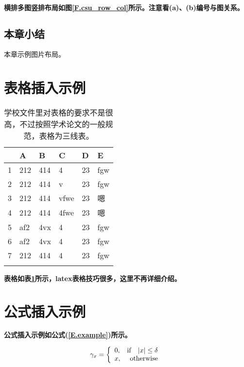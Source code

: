 \textbf{横排多图竖排布局如图\ref{F.csu_row_col}所示。注意看(a)、(b)编号与图关系。}

\subsection{本章小结}
本章示例图片布局。

\newpage


\section{表格插入示例}

\begin{table}[htb]
  \centering
  \caption{学校文件里对表格的要求不是很高，不过按照学术论文的一般规范，表格为三线表。}
  \label{T.example}
  \begin{tabular}{llllll}
  \hline
   & A  & B  & C  & D  & E \\
  \hline
1 	& 212 & 414 & 4 		& 23 & fgw	\\
2 	& 212 & 414 & v 		& 23 & fgw	\\
3 	& 212 & 414 & vfwe		& 23 & 嗯	\\
4 	& 212 & 414 & 4fwe		& 23 & 嗯	\\
5 	& af2 & 4vx & 4 		& 23 & fgw	\\
6 	& af2 & 4vx & 4 		& 23 & fgw	\\
7 	& 212 & 414 & 4 		& 23 & fgw	\\

\hline{}
\end{tabular}
\end{table}

\textbf{表格如表\ref{T.example}所示，latex表格技巧很多，这里不再详细介绍。}

\lipsum

\newpage

\section{公式插入示例}

\lipsum

\textbf{公式插入示例如公式(\ref{E.example})所示。}

\begin{equation}
\gamma_{x}=
\left\{
  \begin{array}{lr}
  0, & {\rm if}~~\;|x| \leq \delta \\
  x, & {\rm otherwise}
  \end{array}
\right.
\label{E.example}
\end{equation}


